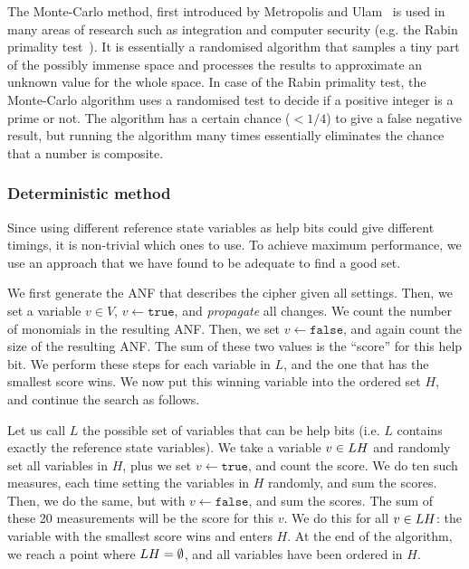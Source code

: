 \documentclass{llncs}
\begin{document}
The Monte-Carlo method, first introduced by Metropolis and Ulam~\cite{Monte-Carlo-method} is used in many areas of research such as integration and computer security (e.g. the Rabin primality test~\cite{Rabin-primality-test}). It is essentially a randomised algorithm that samples a tiny part of the possibly immense space and processes the results to approximate an unknown value for the whole space. In case of the Rabin primality test, the Monte-Carlo algorithm uses a randomised test to decide if a positive integer is a prime or not. The algorithm has a certain chance ($<1/4$) to give a false negative result, but running the algorithm many times essentially eliminates the chance that a number is composite.

\subsubsection{Deterministic method}
Since using different reference state variables as help bits could give different timings, it is non-trivial which ones to use. To achieve maximum performance, we use an approach that we have found to be adequate to find a good set.

We first generate the ANF that describes the cipher given all settings. Then, we set a variable $v \in V$, $v \leftarrow \texttt{true}$, and \emph{propagate} all changes. We count the number of monomials in the resulting ANF. Then, we set $v\leftarrow \texttt{false}$, and again count the size of the resulting ANF. The sum of these two values is the ``score'' for this help bit. We perform these steps for each variable in $L$, and the one that has the smallest score wins. We now put this winning variable into the ordered set $H$, and continue the search as follows.

Let us call $L$ the possible set of variables that can be help bits (i.e. $L$ contains exactly the reference state variables). We take a variable $v \in L\\H$ and randomly set all variables in $H$, plus we set $v \leftarrow \texttt{true}$, and count the score. We do ten such measures, each time setting the variables in $H$ randomly, and sum the scores. Then, we do the same, but with  $v \leftarrow \texttt{false}$, and sum the scores. The sum of these 20 measurements will be the score for this $v$. We do this for all $v \in L\\H$: the variable with the smallest score wins and enters $H$. At the end of the algorithm, we reach a point where $L\\H = \emptyset$, and all variables have been ordered in $H$.
\end{document}

